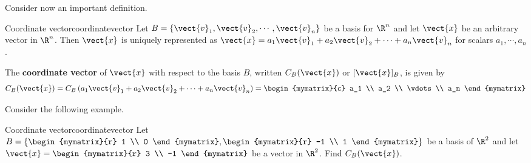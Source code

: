 Consider now an important definition.

\begin{definition}{Coordinate vector}{coordinatevector}
Let $B = \left\{ \vect{v}_1, \vect{v}_2, \cdots, \vect{v}_n \right\}$
be a basis for $\R^n$ and let $\vect{x}$ be an arbitrary
vector in $\R^n$. Then $\vect{x}$ is uniquely represented as
$\vect{x} = a_1\vect{v}_1 +
a_2\vect{v}_2 + \cdots + a_n\vect{v}_n$ for scalars $a_1, \cdots,
a_n$. 

The  \textbf{coordinate vector} of $\vect{x}$ with respect to the
basis $B$, written $C_B(\vect{x})$ or  $[\vect{x}]_B$,  is given by
\[
C_B(\vect{x}) =  C_B \left( a_1\vect{v}_1 + a_2\vect{v}_2 + \cdots + a_n\vect{v}_n \right) = \begin{mymatrix}{c}
a_1 \\
a_2 \\
\vdots \\
a_n
\end{mymatrix}
\] 
\end{definition}

Consider the following example.

\begin{example}{Coordinate vector}{coordinatevector}
Let $B = \left\{ \begin{mymatrix}{r}
1 \\
0 
\end{mymatrix}, \begin{mymatrix}{r}
-1 \\
1
\end{mymatrix} \right\}$ be a basis of $\R^2$ and let $\vect{x} = \begin{mymatrix}{r}
3 \\
-1
\end{mymatrix}$ be a vector in $\R^2$. Find $C_B(\vect{x})$. 
\end{example}

